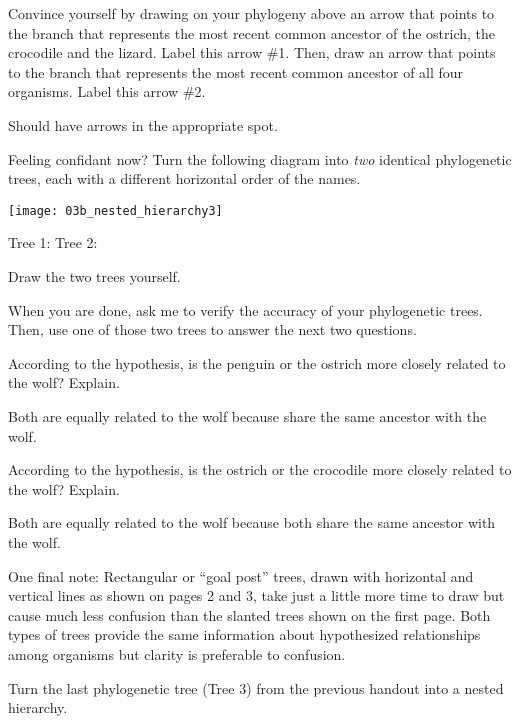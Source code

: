 \documentclass[12pt, hidelinks]{exam}
\newcommand*\AnswerBox[2]{%
    \parbox[t][#1]{0.92\textwidth}{%
    \begin{solution}#2\end{solution}}
}
\begin{document}
\begin{questions}
\setcounter{question}{7}

\question
Convince yourself by drawing on your phylogeny above an
arrow that points to the branch that represents the most recent common
ancestor of the ostrich, the crocodile and the lizard. Label this arrow
\#1. Then, draw an arrow that points to the branch that represents the
most recent common ancestor of all four organisms. Label this arrow \#2.

\AnswerBox{3\baselineskip}{Should have arrows in the appropriate spot.}

\question
Feeling confidant now? Turn the following diagram into
\emph{two} identical phylogenetic trees, each with a different
horizontal order of the names.

\end{questions}

\begin{center}
	\noindent\texttt{[image: 03b\_nested\_hierarchy3]}
\end{center}

Tree 1: \hspace*{0.4\textwidth}Tree 2:

\AnswerBox{3\baselineskip}{Draw the two trees yourself.}

\newpage

When you are done, ask me to verify the accuracy of your phylogenetic
trees. Then, use one of those two trees to answer the next two
questions.

\begin{questions}
\setcounter{question}{9}

\question
According to the hypothesis, is the penguin or the ostrich
more closely related to the wolf? Explain.

\AnswerBox{5\baselineskip}{Both are equally related to the wolf because 
share the same ancestor with the wolf.}

\question
According to the hypothesis, is the ostrich or the
crocodile more closely related to the wolf? Explain.

\AnswerBox{5\baselineskip}{Both are equally related to the wolf because
both share the same ancestor with the wolf.}


One final note: Rectangular or “goal post” trees, drawn with horizontal and vertical
lines as shown on pages 2 and 3, take just a little more time to draw but
cause much less confusion than the slanted trees shown on the first page.
Both types of trees provide the same information about hypothesized
relationships among organisms but clarity is preferable to confusion.

\question[Checkout]
Turn the last phylogenetic tree (Tree 3) from the previous handout into a nested hierarchy.


\end{questions}
\end{document}
